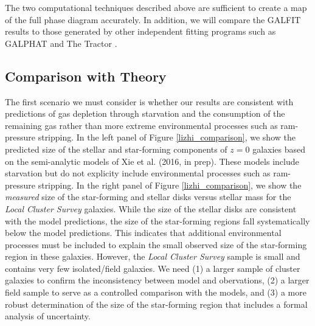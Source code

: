 \documentclass[11pt, preprint]{aastex}
\begin{document}
{The two computational techniques described above are sufficient to
create a map of the full phase diagram accurately.  In addition, we
will compare the GALFIT results to those generated by other
independent fitting programs such as 
GALPHAT \citep{yoon11} and The Tractor \citep{lang16}.


\vspace*{-1cm}
\subsection{Comparison with Theory}
\vspace*{-.4cm}

The first scenario we must consider is whether our results are
consistent with predictions of gas depletion through starvation and
the consumption of the remaining gas
rather than more extreme environmental processes such as ram-pressure stripping.
In the left panel of Figure \ref{lizhi_comparison}, we show the predicted size of the
stellar and star-forming components of $z = 0$ galaxies based on the
semi-analytic models of Xie et al. (2016, in prep).  These models
include starvation but do not explicity include environmental
processes such as ram-pressure stripping.  In the right panel of
Figure \ref{lizhi_comparison}, we show the {\it measured} size of the
star-forming and stellar disks versus stellar mass for the {\it Local
  Cluster Survey} galaxies.  While the size of the stellar disks are
consistent with the model predictions, the size of the star-forming
regions fall systematically below the model predictions.  This
indicates that additional environmental processes must be included to
explain the small observed size of the star-forming region in these
galaxies.  However, the {\it Local Cluster Survey} sample is small and
contains very few isolated/field galaxies.
We need (1) a larger sample of cluster galaxies to confirm the inconsistency between model
and obervations, (2) a larger field sample to serve as a controlled
comparison with the models, and (3) a more robust determination of
the size of the star-forming region that includes a formal analysis of
uncertainty.
\begin{figure}[h!]
\begin{center}

\end{center}
\end{figure}}
\end{document}
